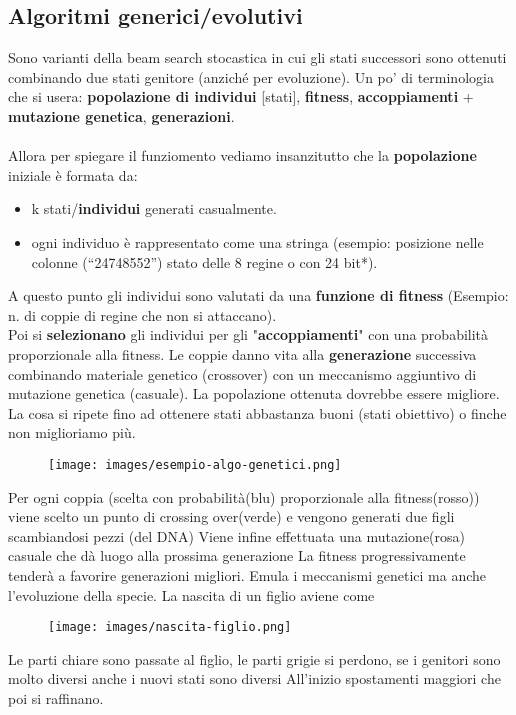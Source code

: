 \subsection{Algoritmi generici/evolutivi}
Sono varianti della beam search stocastica in cui gli stati successori sono ottenuti combinando due stati genitore (anziché per evoluzione).
Un po' di terminologia che si usera: \textbf{popolazione di individui} [stati], \textbf{fitness}, \textbf{accoppiamenti} + \textbf{mutazione genetica}, \textbf{generazioni}.\\\\
Allora per spiegare il funziomento vediamo insanzitutto che la \textbf{popolazione} iniziale è formata da:
\begin{itemize}
    \item k stati/\textbf{individui} generati casualmente.
    \item ogni individuo è rappresentato come una stringa (esempio: posizione nelle colonne (“24748552”) stato delle
    8 regine o con 24 bit*).
\end{itemize}
A questo punto gli individui sono valutati da una \textbf{funzione di fitness} (Esempio: n. di coppie di regine che non si attaccano).\\ 
Poi si \textbf{selezionano} gli individui per gli "\textbf{accoppiamenti}" con una probabilità proporzionale alla fitness.
Le coppie danno vita alla \textbf{generazione} successiva combinando materiale genetico (crossover) con un meccanismo aggiuntivo di mutazione genetica (casuale). 
La popolazione ottenuta dovrebbe essere migliore. La cosa si ripete fino ad ottenere stati abbastanza buoni (stati obiettivo) o finche non miglioriamo più.
\begin{example}
    \begin{figure}[h!]
        \centering
        \texttt{[image: images/esempio-algo-genetici.png]}
    \end{figure}
    Per ogni coppia (scelta con probabilità(blu) proporzionale alla fitness(rosso)) viene scelto un punto di crossing over(verde) e vengono generati due figli scambiandosi pezzi (del DNA)
    Viene infine effettuata una mutazione(rosa) casuale che dà luogo alla prossima generazione
    La fitness progressivamente tenderà a favorire generazioni migliori. Emula i meccanismi genetici ma anche l’evoluzione della specie.
    La nascita di un figlio aviene come
    \begin{figure}[h!]
        \centering
        \texttt{[image: images/nascita-figlio.png]}
    \end{figure}

    \hspace{-15pt}Le parti chiare sono passate al figlio, le parti grigie si perdono, se i genitori sono molto diversi anche i nuovi stati sono diversi
    All'inizio spostamenti maggiori che poi si raffinano.
\end{example}
